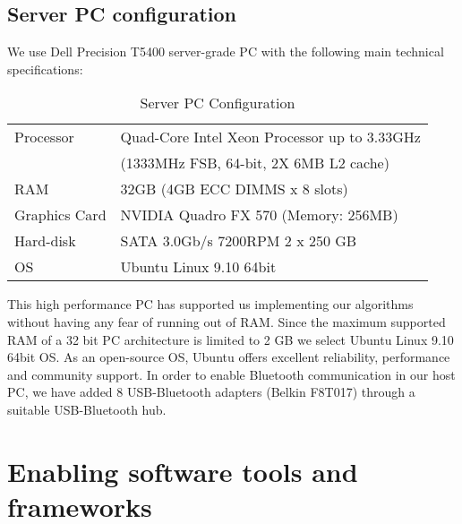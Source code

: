 \subsection{Server PC configuration}
We use Dell  Precision T5400 server-grade PC with the following main technical specifications:
\begin{table}
\caption{Server PC Configuration}
\label{table:server-pc}
\begin{center}
\begin{tabular}{|l||l|}
\hline Processor & Quad-Core Intel Xeon Processor up to 3.33GHz\\ 
& (1333MHz FSB, 64-bit, 2X 6MB L2 cache)\\
\hline RAM & 32GB (4GB ECC DIMMS x 8 slots)\\
\hline Graphics Card & NVIDIA Quadro FX 570 (Memory: 256MB)\\
\hline Hard-disk &  SATA 3.0Gb/s 7200RPM  2 x 250 GB\\
\hline OS & Ubuntu Linux 9.10 64bit\\
\hline
\end{tabular}
\end{center}
\end{table}
This high performance PC has supported us implementing our algorithms without having any fear of running out of RAM.  Since the maximum supported RAM of a 32 bit PC architecture is limited to 2 GB we select Ubuntu Linux 9.10 64bit OS.  As an open-source OS,  Ubuntu offers excellent reliability, performance and community support. In order to enable Bluetooth communication in our host PC, we have added 8 USB-Bluetooth adapters (Belkin F8T017) through a suitable USB-Bluetooth hub. 
\section{Enabling software tools and frameworks}
